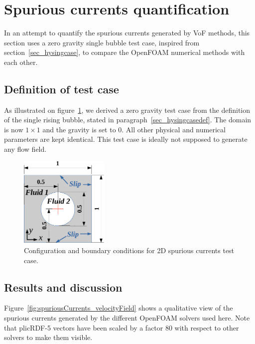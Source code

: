 \documentclass[review]{elsarticle}
\begin{document}
\clearpage
\section{Spurious currents quantification}\label{sec_spuriouscase}

In an attempt to quantify the spurious currents generated by VoF methods, this section uses a zero gravity single bubble test case, inspired from section~\ref{sec_hysingcase}, to compare the OpenFOAM numerical methods with each other. 

\subsection{Definition of test case}\label{sec_spuriouscasedef}

As illustrated on figure~\ref{fig:spuriousCurrents_scheme}, we derived a zero gravity test case from the definition of the single rising bubble, stated in paragraph~\ref{sec_hysingcasedef}. The domain is now $1\times 1$ and the gravity is set to 0. All other physical and numerical parameters are kept identical. This test case is ideally not supposed to generate any flow field. 

\begin{figure}[!h]
\begin{center}
 \vspace{-1mm}
 \includegraphics[width=4.25cm]{figures/spuriousCurrents_scheme.pdf}
 \vspace{-7mm}
\end{center}
\caption{Configuration and boundary conditions for 2D spurious currents test case.}
\label{fig:spuriousCurrents_scheme}
\end{figure}

\subsection{Results and discussion}\label{sec_spuriousresults}
Figure~\ref{fig:spuriousCurrents_velocityField} shows a qualitative view of the spurious currents generated by the different OpenFOAM solvers used here. Note that plicRDF-5 vectors have been scaled by a factor 80 with respect to other solvers to make them visible.
\end{document}
